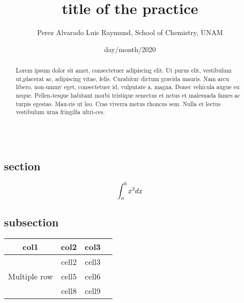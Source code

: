 \documentclass{article}
\title{title of the practice}
\author{Perez Alvarado Luis Raymund, School of Chemistry, UNAM}
\date{day/month/2020}
\newcommand{\nec}[1]{\begin{equation} #1 \newline \end{equation}}
\newcommand{\n}{\\}
\begin{document}
    \justify


    \maketitle
    
    \begin{abstract}
        \item Lorem ipsum dolor sit amet, consectetuer adipiscing elit. Ut purus elit, vestibulum ut,placerat ac, adipiscing vitae, felis. Curabitur dictum gravida mauris. Nam arcu libero, non-ummy eget, consectetuer id, vulputate a, magna. Donec vehicula augue eu neque. Pellen-tesque habitant morbi tristique senectus et netus et malesuada fames ac turpis egestas. Mau-ris ut leo. Cras viverra metus rhoncus sem. Nulla et lectus vestibulum urna fringilla ultri-ces.
        \item  ~ \n
    \end{abstract}

    
    
    \begin{multicols}{2}
   
        \section*{section}
        \lipsum[1-2]
        \nec{\int_{a}^{b} x^2 dx}

        \subsection*{subsection}
        \lipsum[1-2]
        \begin{center}
            \begin{tabular}{ |c|c|c|c| } 
            \hline
            col1 & col2 & col3 \\
            \hline
            \multirow{3}{4em}{Multiple row} & cell2 & cell3 \\ 
            & cell5 & cell6 \\ 
            & cell8 & cell9 \\ 
            \hline
            \end{tabular}
            \end{center}

    \end{multicols}
    
\end{document}
